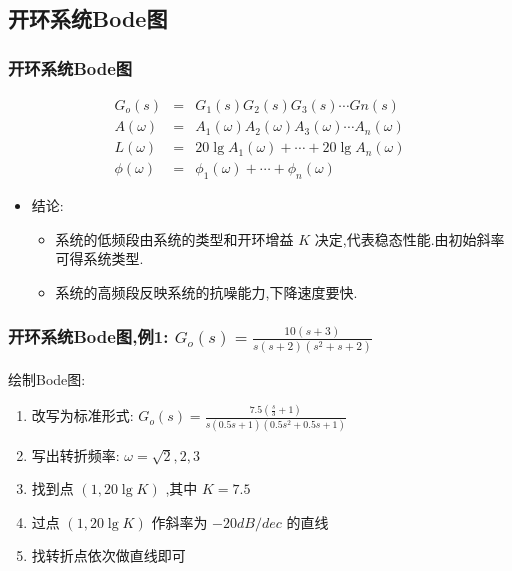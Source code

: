 \documentclass[table]{beamer}
\begin{document}
\subsection{开环系统Bode图}
\label{sec-3-2}
\begin{frame}
\frametitle{开环系统Bode图}
\label{sec-3-2-1}

\begin{eqnarray*}
G_o(s) &=  &G_1(s)G_2(s)G_3(s)\cdots Gn(s) \\
A(\omega) &=&A_1(\omega)A_2(\omega)A_3(\omega)\cdots A_n(\omega)\\
L(\omega) &=&20\lg A_1(\omega)+\cdots+20\lg A_n(\omega) \\
\phi(\omega) &=& \phi_1(\omega)+\cdots+\phi_n(\omega)
\end{eqnarray*}

\begin{itemize}
\item <2->结论:
\begin{itemize}
\item <2->系统的低频段由系统的类型和开环增益  $K$  决定,代表稳态性能.由初始斜率可得系统类型.
\item <3->系统的高频段反映系统的抗噪能力,下降速度要快.
\end{itemize}
\end{itemize}
\end{frame}
\begin{frame}
\frametitle{开环系统Bode图,例1: $G_o(s)=\frac{10(s+3)}{s(s+2)(s^2+s+2)}$}
\label{sec-3-2-2}

   绘制Bode图:
\begin{enumerate}
\item <2->改写为标准形式:  $G_o(s)=\frac{7.5(\frac{s}{3}+1)}{s(0.5s+1)(0.5s^2+0.5s+1)}$
\item <3->写出转折频率:  $\omega=\sqrt{2},2,3$
\item <4->找到点  $(1,20\lg K)$  ,其中 $K=7.5$
\item <5->过点  $(1,20\lg K)$  作斜率为  $-20dB/dec$  的直线
\item <6->找转折点依次做直线即可
\end{enumerate}
\end{frame}
\end{document}
